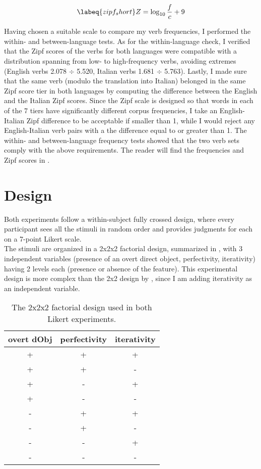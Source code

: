 \begin{equation} \labeq{zipf_short}
Z = \log _{10} \frac{f}{c} + 9
\end{equation}

Having chosen a suitable scale to compare my verb frequencies, I performed the within- and between-language tests. As for the within-language check, I verified that the Zipf scores of the verbs for both languages were compatible with a distribution spanning from low- to high-frequency verbs, avoiding extremes (English verbs 2.078 $\div$ 5.520, Italian verbs 1.681 $\div$ 5.763). Lastly, I made sure that the same verb (modulo the translation into Italian) belonged in the same Zipf score tier in both languages by computing the difference between the English and the Italian Zipf scores. Since the Zipf scale is designed so that words in each of the 7 tiers have significantly different corpus frequencies, I take an English-Italian Zipf difference to be acceptable if smaller than 1, while I would reject any English-Italian verb pairs with a the difference equal to or greater than 1. The within- and between-language frequency tests showed that the two verb sets comply with the above requirements. The reader will find the frequencies and Zipf scores in .

\section{Design} 

Both experiments follow a within-subject fully crossed design, where every participant sees all the stimuli in random order and provides judgments for each on a 7-point Likert scale.\\
The stimuli are organized in a 2x2x2 factorial design, summarized in , with 3 independent variables (presence of an overt direct object, perfectivity, iterativity) having 2 levels each (presence or absence of the feature). This experimental design is more complex than the 2x2 design by \textcite{Medina2007}, since I am adding iterativity as an independent variable.

\begin{table}[htb] %
\caption{The 2x2x2 factorial design used in both Likert experiments.}
\begin{tabular}{ccc}
overt dObj & perfectivity & iterativity \\
\hline
+          & +            & +           \\
+          & +            & -           \\
+          & -            & +           \\
+          & -            & -           \\
-          & +            & +           \\
-          & +            & -           \\
-          & -            & +           \\
-          & -            & -          
\end{tabular}
\end{table}

